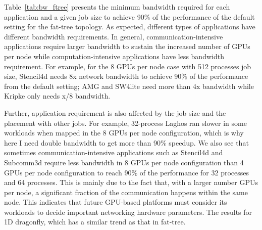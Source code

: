 Table~\ref{tab:bw_ftree} presents the minimum bandwidth required for each
application and a given job size to achieve 90\% of the performance of the
default setting for the fat-tree topology.  As expected, different types of
applications have different bandwidth requirements. In general,
communication-intensive applications require larger bandwidth to sustain the
increased number of GPUs per node while computation-intensive applications have
less bandwidth requirement. For example, for the 8 GPUs per node case with 512 processes
job size, Stencil4d needs 8x network bandwidth
to achieve 90\% of the performance from the default setting; AMG and SW4lite need more than 
4x bandwidth while
Kripke only needs x/8 bandwidth. 

\begin{table}[t]
  \centering
  \caption{Minimum bandwidth required to achieve 90\% of the performance of the
  default 1 GPU/node configuration for fat-tree}
    \label{tab:bw_ftree}
    \vspace{-1em}
\end{table}

Further, application requirement is also affected by the job size and the
placement with other jobs.  For example, 32-process Laghos ran slower in some
workloads when mapped in the 8 GPUs per node configuration, which is why here I
need double bandwidth to get more than 90\% speedup. We also see that sometimes
communication-intensive applications such as Stencil4d and Subcomm3d require
less bandwidth in 8 GPUs per node configuration than 4 GPUs per node
configuration to reach 90\% of the performance for 32 processes and 64 processes.  This
is mainly due to the fact that, with a larger number GPUs per node, a significant
fraction of the communication happens within the same node.  This indicates that
future GPU-based platforms must consider its workloads to decide important
networking hardware parameters.  The results for 1D
dragonfly, which has a similar trend as that in fat-tree. 



